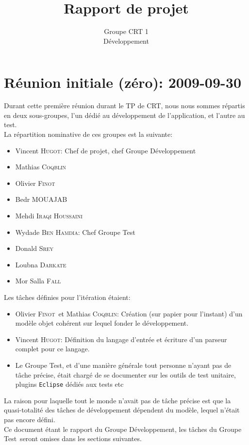 \documentclass[a4paper,12pt]{article}
\author{Groupe CRT 1\\Développement}
\title{Rapport de projet}
\def\familyname{\textsc}
\def\firstname#1{#1}
\def\groupmember#1#2{\firstname{#1} \familyname{#2}}
\def\mwyd{\groupmember{Wydade}{Ben Hamdia}}
\def\mmat{\groupmember{Mathias}{Coqblin}}
\def\mlou{\groupmember{Loubna}{Darkate}}
\def\mmor{\groupmember{Mor Salla}{Fall}}
\def\moli{\groupmember{Olivier}{Finot}}
\def\mvin{\groupmember{Vincent}{Hugot}}
\def\mmed{\groupmember{Mehdi}{Iraqi Houssaini}}
\def\mbed{\groupmember{Bedr}{MOUAJAB}}
\def\mdon{\groupmember{Donald}{Srey}}
\def\grpd{Groupe Développement}
\def\grpt{Groupe Test}
\begin{document}
 
\maketitle


\tableofcontents


\section{Réunion initiale (zéro): 2009-09-30}

Durant cette première réunion durant le TP de CRT, nous 
nous sommes répartis en deux sous-groupes, l'un dédié au développement
de l'application, et l'autre au test.\mk\\
%
La répartition nominative de ces groupes est la suivante:
\begin{itemize}
\item \mvin : Chef de projet, chef \grpd
\item \mmat
\item \moli
\item \mbed
\item \mmed
\end{itemize}


\begin{itemize}
\item \mwyd : Chef \grpt
\item \mdon
\item \mlou
\item \mmor
\end{itemize}


\noi Les tâches définies pour l'itération étaient:

\begin{itemize}
 \item \moli\ et \mmat: Création (sur papier pour l'instant) d'un modèle objet cohérent sur lequel fonder le développement.
\item  \mvin : Définition du langage d'entrée et écriture d'un parseur complet pour ce langage.
\item Le \grpt, et d'une manière générale tout personne n'ayant pas de tâche précise,
était chargé de se documenter sur les outils de test
unitaire, plugins \texttt{Eclipse} dédiés aux tests etc
\end{itemize}
La raison pour laquelle tout le monde n'avait pas de tâche précise est que la 
quasi-totalité des tâches de développement dépendent du modèle, lequel n'était 
pas encore défini.\mk\\
%
Ce document étant le rapport du \grpd, les tâches du \grpt\ seront
omises dans les sections suivantes.
\end{document}
